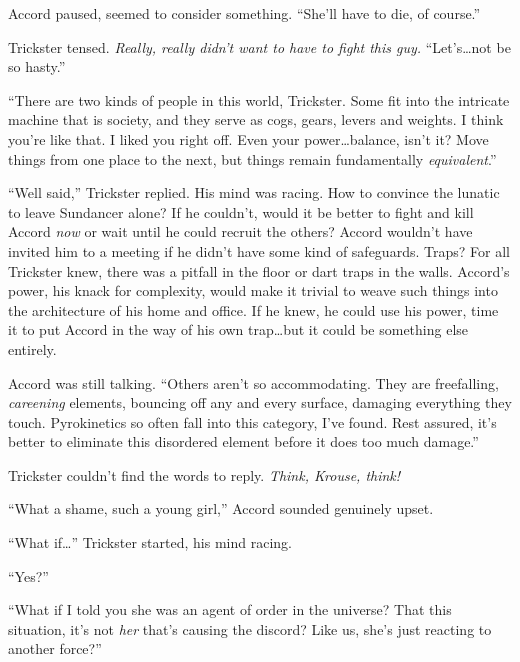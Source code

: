 Accord paused, seemed to consider something.  ``She'll have to die, of course.''



Trickster tensed.  \emph{Really, really didn't want to have to fight this guy.  }``Let's\ldots not be so hasty.''



``There are two kinds of people in this world, Trickster.  Some fit into the intricate machine that is society, and they serve as cogs, gears, levers and weights.  I think you're like that.  I liked you right off.  Even your power\ldots balance, isn't it?  Move things from one place to the next, but things remain fundamentally \emph{equivalent}.''



``Well said,'' Trickster replied.  His mind was racing.  How to convince the lunatic to leave Sundancer alone?  If he couldn't, would it be better to fight and kill Accord \emph{now }or wait until he could recruit the others?  Accord wouldn't have invited him to a meeting if he didn't have some kind of safeguards.  Traps?  For all Trickster knew, there was a pitfall in the floor or dart traps in the walls.  Accord's power, his knack for complexity, would make it trivial to weave such things into the architecture of his home and office.  If he knew, he could use his power, time it to put Accord in the way of his own trap\ldots but it could be something else entirely.



Accord was still talking.  ``Others aren't so accommodating.  They are freefalling, \emph{careening} elements, bouncing off any and every surface, damaging everything they touch.  Pyrokinetics so often fall into this category, I've found.  Rest assured, it's better to eliminate this disordered element before it does too much damage.''



Trickster couldn't find the words to reply.  \emph{Think, Krouse, think!}



``What a shame, such a young girl,'' Accord sounded genuinely upset.



``What if\ldots'' Trickster started, his mind racing.



``Yes?''



``What if I told you she was an agent of order in the universe?  That this situation, it's not \emph{her} that's causing the discord?  Like us, she's just reacting to another force?''



